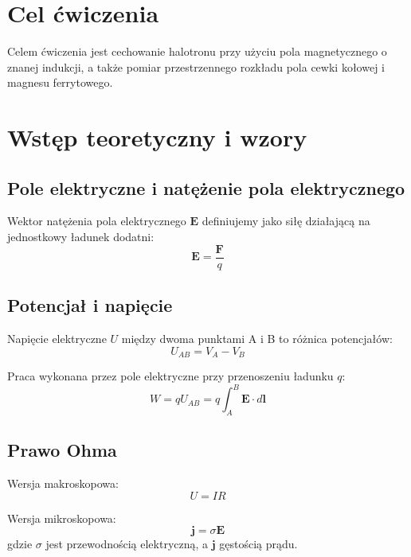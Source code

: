 \documentclass{fizykalab}
\begin{document}
\maketitle

\section{Cel ćwiczenia}
Celem ćwiczenia jest cechowanie halotronu przy użyciu pola magnetycznego o znanej indukcji, a także pomiar przestrzennego rozkładu pola cewki kołowej i magnesu ferrytowego.

\section{Wstęp teoretyczny i wzory}

\subsection{Pole elektryczne i natężenie pola elektrycznego}
Wektor natężenia pola elektrycznego $\mathbf{E}$ definiujemy jako siłę działającą na jednostkowy ładunek dodatni:
\begin{equation}
  \mathbf{E} = \frac{\mathbf{F}}{q}
\end{equation}

\subsection{Potencjał i napięcie}
Napięcie elektryczne $U$ między dwoma punktami A i B to różnica potencjałów:
\begin{equation}
  U_{AB} = V_A - V_B
\end{equation}

Praca wykonana przez pole elektryczne przy przenoszeniu ładunku $q$:
\begin{equation}
  W = qU_{AB} = q\int_A^B \mathbf{E} \cdot d\mathbf{l}
\end{equation}

\subsection{Prawo Ohma}
Wersja makroskopowa:
\begin{equation}
  U = IR
\end{equation}

Wersja mikroskopowa:
\begin{equation}
  \mathbf{j} = \sigma \mathbf{E}
\end{equation}
gdzie $\sigma$ jest przewodnością elektryczną, a $\mathbf{j}$ gęstością prądu.
\end{document}
